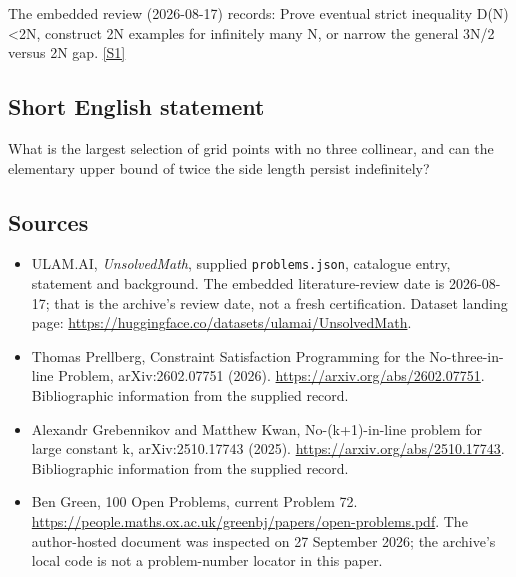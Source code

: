 \documentclass[11pt,a4paper]{article}
\newcommand{\sref}[2]{\hyperlink{source:#1:#2}{[S#2]}}
\begin{document}
The embedded review (2026-08-17) records: Prove eventual strict inequality D(N)<2N, construct 2N examples for infinitely many N, or narrow the general 3N/2 versus 2N gap. \sref{statement}{1}

\subsection{Short English statement}

What is the largest selection of grid points with no three collinear, and can the elementary upper bound of twice the side length persist indefinitely?

\subsection{Sources}

{\small

\begin{itemize}

\item[\hypertarget{source:statement:1}{S1}] ULAM.AI, \emph{UnsolvedMath}, supplied \texttt{problems.json}, catalogue entry, statement and background. The embedded literature-review date is 2026-08-17; that is the archive’s review date, not a fresh certification. Dataset landing page: \url{https://huggingface.co/datasets/ulamai/UnsolvedMath}.

\item[\hypertarget{source:statement:2}{S2}] Thomas Prellberg, Constraint Satisfaction Programming for the No-three-in-line Problem, arXiv:2602.07751 (2026). \url{https://arxiv.org/abs/2602.07751}. Bibliographic information from the supplied record.

\item[\hypertarget{source:statement:3}{S3}] Alexandr Grebennikov and Matthew Kwan, No-(k+1)-in-line problem for large constant k, arXiv:2510.17743 (2025). \url{https://arxiv.org/abs/2510.17743}. Bibliographic information from the supplied record.

\item[\hypertarget{source:statement:4}{S4}] Ben Green, 100 Open Problems, current Problem 72. \url{https://people.maths.ox.ac.uk/greenbj/papers/open-problems.pdf}. The author-hosted document was inspected on 27 September 2026; the archive’s local code is not a problem-number locator in this paper.

\end{itemize}

}

\label{end:statement}
\end{document}
